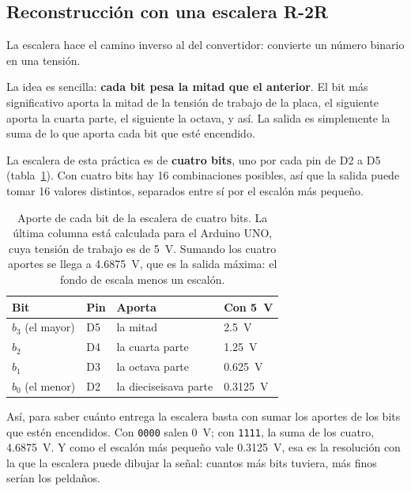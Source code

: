 \documentclass[11pt,a4paper]{article}
\begin{document}
\subsection{Reconstrucción con una escalera R-2R}
La escalera hace el camino inverso al del convertidor: convierte un número binario en
una tensión.

La idea es sencilla: \textbf{cada bit pesa la mitad que el anterior}. El bit más
significativo aporta la mitad de la tensión de trabajo de la placa, el siguiente
aporta la cuarta parte, el siguiente la octava, y así. La salida es simplemente la
suma de lo que aporta cada bit que esté encendido.

La escalera de esta práctica es de \textbf{cuatro bits}, uno por cada pin de D2 a D5
(tabla~\ref{tab:escalones}). Con cuatro bits hay \num{16} combinaciones posibles, así
que la salida puede tomar \num{16} valores distintos, separados entre sí por el
escalón más pequeño.

\begin{table}[H]
  \centering
  \caption[Aporte de cada bit de la escalera]{Aporte de cada bit de la escalera de
  cuatro bits. La última columna está calculada para el Arduino UNO, cuya tensión de
  trabajo es de \qty{5}{\volt}. Sumando los cuatro aportes se llega a
  \qty{4.6875}{\volt}, que es la salida máxima: el fondo de escala menos un escalón.}
  \label{tab:escalones}
  \small
  \begin{tabularx}{0.9\linewidth}{@{}>{\centering\arraybackslash}X>{\centering\arraybackslash}X>{\centering\arraybackslash}X>{\centering\arraybackslash}X@{}}
    \toprule
    \textbf{Bit} & \textbf{Pin} & \textbf{Aporta} & \textbf{Con \qty{5}{\volt}} \\
    \midrule
    $b_3$ (el mayor) & D5 & la mitad          & \qty{2.5}{\volt} \\
    $b_2$            & D4 & la cuarta parte   & \qty{1.25}{\volt} \\
    $b_1$            & D3 & la octava parte   & \qty{0.625}{\volt} \\
    $b_0$ (el menor) & D2 & la dieciseisava parte & \qty{0.3125}{\volt} \\
    \bottomrule
  \end{tabularx}
\end{table}

Así, para saber cuánto entrega la escalera basta con sumar los aportes de los bits que
estén encendidos. Con \texttt{0000} salen \qty{0}{\volt}; con \texttt{1111}, la suma de
los cuatro, \qty{4.6875}{\volt}. Y como el escalón más pequeño vale
\qty{0.3125}{\volt}, esa es la resolución con la que la escalera puede dibujar la
señal: cuantos más bits tuviera, más finos serían los peldaños.
\end{document}
